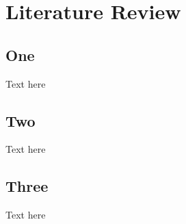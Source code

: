 
\chapter{Literature Review}

\section{One}
Text here
\section{Two}
Text here
\section{Three}
Text here


\newpage
